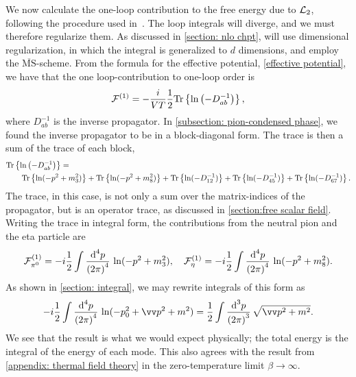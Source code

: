 We now calculate the one-loop contribution to the free energy due to $\mathcal{L}_2$, following the procedure used in~\autocite{adhikariTwoflavorChiralPerturbation2019,martinariaTwoflavorChiralPerturbation2020,adhikariQuarkPionAxial2021}.
The loop integrals will diverge, and we must therefore regularize them.
As discussed in \autoref{section: nlo chpt}, will use dimensional regularization, in which the integral is generalized to $d$ dimensions, and employ the $\overline{\mathrm{MS}}$-scheme.
From the formula for the effective potential, \autoref{effective potential}, we have that the one loop-contribution to one-loop order is 
%
\begin{equation}
    \mathcal{F}^{(1)}
    =
    - \frac{i}{V T} \frac{1}{2}
    \text{Tr} \left\{ \ln\left( - D_{ab}^{-1}\right) \right\},
\end{equation}
%
where $D_{ab}^{-1}$ is the inverse propagator.
In \autoref{subsection: pion-condensed phase}, we found the inverse propagator to be in a block-diagonal form.
The trace is then a sum of the trace of each block,
%
\begin{align}
    \nonumber
    &\text{Tr} \left\{ \ln\left( - D_{ab}^{-1}\right) \right\}
    =\\\nonumber
    &\quad\quad
    \text{Tr} \left\{ \ln(-p^2 + m_3^2) \right\}
    + \text{Tr} \left\{ \ln(-p^2 + m_8^2) \right\}
    + \text{Tr} \left\{ \ln(-D_{12}^{-1}) \right\}
    + \text{Tr} \left\{ \ln(-D_{45}^{-1}) \right\}
    + \text{Tr} \left\{ \ln(-D_{67}^{-1}) \right\}.
\end{align}
%
The trace, in this case, is not only a sum over the matrix-indices of the propagator, but is an operator trace, as discussed in \autoref{section:free scalar field}.
Writing the trace in integral form, the contributions from the neutral pion and the eta particle are
%
\begin{align}
    \mathcal{F}_{\pi^0}^{(1)}
    = -i\frac{1}{2} \int \frac{\text{d}^4 p}{{(2\pi)}^4}\, \ln(-p^2 + m_3^2), \quad
    \mathcal{F}_{\eta}^{(1)}
    = -i\frac{1}{2} \int \frac{\text{d}^4 p}{{(2\pi)}^4}\, \ln(-p^2 + m_8^2).
\end{align}
%
As shown in \autoref{section: integral}, we may rewrite integrals of this form as
%
\begin{equation}
    -i\frac{1}{2} \int \frac{\dd^4 p}{{(2\pi)}^4}\, \ln(-p_0^2 + \vv p^2 + m^2)
    = \frac{1}{2} \int  \frac{\dd^3 p}{{(2\pi)}^3 } \, \sqrt{\vv p^2 + m^2}.
\end{equation}
%
We see that the result is what we would expect physically; the total energy is the integral of the energy of each mode.
This also agrees with the result from \autoref{appendix: thermal field theory} in the zero-temperature limit $\beta \rightarrow \infty$.
